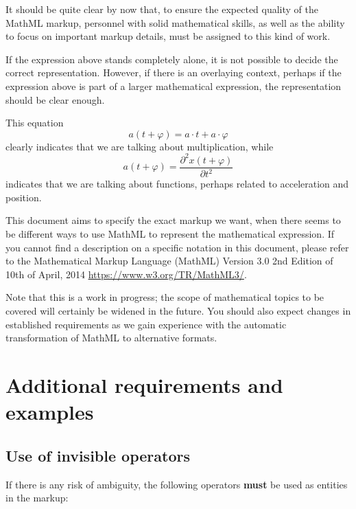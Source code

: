 \documentclass[english,a4paper,11pt]{article}
\begin{document}
It should be quite clear by now that, to ensure the expected quality of the MathML markup, personnel with solid mathematical skills, as well as the ability to focus on important markup details, must be assigned to this kind of work.


If the expression above stands completely alone, it is not possible to decide the correct representation. However, if there is an overlaying context, perhaps if the expression above is part of a larger mathematical expression, the representation should be clear enough.

This equation
\begin{equation}
a (t + \varphi) = a \cdot t + a \cdot \varphi
\end{equation}
clearly indicates that we are talking about multiplication, while
\begin{equation}
a (t + \varphi) = \frac{\partial^2 x(t + \varphi)}{\partial t^2}
\end{equation}
indicates that we are talking about functions, perhaps related to acceleration and position.

\bigskip

This document aims to specify the exact markup we want, when there seems to be different ways to use MathML to represent the mathematical expression. If you cannot find a description on a specific notation in this document, please refer to the Mathematical Markup Language (MathML) Version 3.0 2nd Edition of 10th of April, 2014 \url{https://www.w3.org/TR/MathML3/}. 

\bigskip

Note that this is a work in progress; the scope of mathematical topics to be covered will certainly be widened in the future. You should also expect changes in established requirements as we gain experience with the automatic transformation of MathML to alternative formats.

\vfill
\pagebreak

\section{Additional requirements and examples}

\subsection{Use of invisible operators}

If there is any risk of ambiguity, the following operators \textbf{must} be used as entities in the markup:
\end{document}
